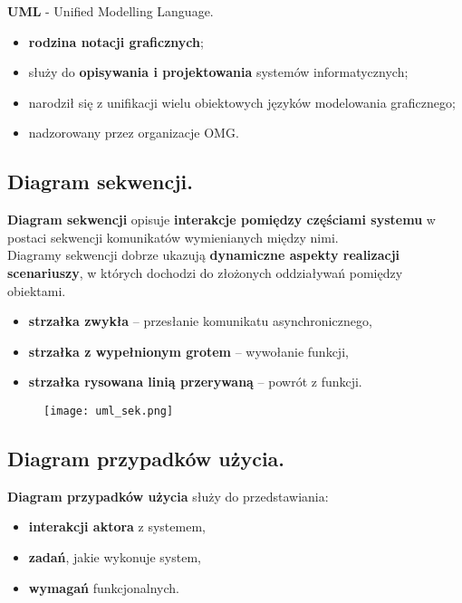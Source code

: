 \documentclass[main.tex]{subfiles}
\begin{document}
    \textbf{UML} - Unified Modelling Language.
    \begin{itemize}[noitemsep]
        \item \textbf{rodzina notacji graficznych};
        \item służy do \textbf{opisywania i projektowania} systemów informatycznych;
        \item narodził się z unifikacji wielu obiektowych języków modelowania graficznego;
        \item nadzorowany przez organizacje OMG.
    \end{itemize}

    \subsection{Diagram sekwencji.}

    \textbf{Diagram sekwencji} opisuje \textbf{interakcje pomiędzy częściami systemu} w postaci sekwencji
    komunikatów wymienianych między nimi.\\

    \noindent Diagramy sekwencji dobrze ukazują \textbf{dynamiczne aspekty realizacji scenariuszy}, w których dochodzi do złożonych
    oddziaływań pomiędzy obiektami.
    \begin{itemize}[noitemsep]
        \item \textbf{strzałka zwykła} -- przesłanie komunikatu asynchronicznego,
        \item \textbf{strzałka z wypełnionym grotem} -- wywołanie funkcji,
        \item \textbf{strzałka rysowana linią przerywaną} -- powrót z funkcji.
    \end{itemize}

    \begin{figure}[H]
        \texttt{[image: uml\_sek.png]}
    \end{figure}

    \subsection{Diagram przypadków użycia.}

    \textbf{Diagram przypadków użycia} służy do przedstawiania:
    \begin{itemize}[noitemsep]
        \item \textbf{interakcji aktora} z systemem,
        \item \textbf{zadań}, jakie wykonuje system,
        \item \textbf{wymagań} funkcjonalnych.
    \end{itemize}
\end{document}
